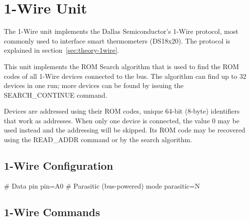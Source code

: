 \section{1-Wire Unit}

The 1-Wire unit implements the Dallas Semiconductor's 1-Wire protocol, most commonly used to interface smart thermometers (DS18x20). The protocol is explained in section~\ref{sec:theory-1wire}.

This unit implements the ROM Search algorithm that is used to find the ROM codes of all 1-Wire devices connected to the bus. The algorithm can find up to 32 devices in one run; more devices can be found by issuing the SEARCH\_CONTINUE command.

Devices are addressed using their ROM codes, unique 64-bit (8-byte) identifiers that work as addresses. When only one device is connected, the value 0 may be used instead and the addressing will be skipped. Its ROM code may be recovered using the READ\_ADDR command or by the search algorithm.

\subsection{1-Wire Configuration}

\begin{inicode}
[1WIRE:ow@7]
# Data pin
pin=A0
# Parasitic (bus-powered) mode
parasitic=N
\end{inicode}

\subsection{1-Wire Commands}

